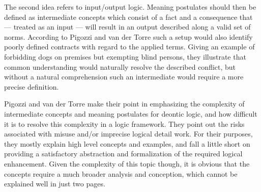 \documentclass[12pt]{article}
\begin{document}
The second idea refers to input/output logic. Meaning postulates should then be defined as intermediate concepts which consist of a fact and a consequence that --- treated as an input --- will result in an output described along a valid set of norms. According to Pigozzi and van der Torre such a setup would also identify poorly defined contracts with regard to the applied terms. Giving an example of forbidding dogs on premises but exempting blind persons, they illustrate that common understanding would naturally resolve the described conflict, but without a natural comprehension such an intermediate would require a more precise definition.

Pigozzi and van der Torre make their point in emphasizing the complexity of intermediate concepts and meaning postulates for deontic logic, and how difficult it is to resolve this complexity in a logic framework. They point out the risks associated with misuse and/or imprecise logical detail work. For their purposes, they mostly explain high level concepts and examples, and fall a little short on providing a satisfactory abstraction and formalization of the required logical enhancement. Given the complexity of this topic though, it is obvious that the concepts require a much broader analysis and conception, which cannot be explained well in just two pages.



\end{document}
